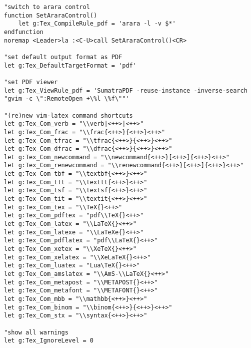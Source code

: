 \documentclass{article}
\newcommand{\syntax}[1]{\PVerb{#1}}
\begin{document}
{\begin{verbatim}
"switch to arara control
function SetAraraControl()
	let g:Tex_CompileRule_pdf = 'arara -l -v $*'
endfunction
noremap <Leader>la :<C-U>call SetAraraControl()<CR>

"set default output format as PDF
let g:Tex_DefaultTargetFormat = 'pdf'

"set PDF viewer
let g:Tex_ViewRule_pdf = 'SumatraPDF -reuse-instance -inverse-search "gvim -c \":RemoteOpen +\%l \%f\""'

"(re)new vim-latex command shortcuts
let g:Tex_Com_verb = "\\verb|<++>|<++>"
let g:Tex_Com_frac = "\\frac{<++>}{<++>}<++>"
let g:Tex_Com_tfrac = "\\tfrac{<++>}{<++>}<++>"
let g:Tex_Com_dfrac = "\\dfrac{<++>}{<++>}<++>"
let g:Tex_Com_newcommand = "\\newcommand{<++>}[<++>]{<++>}<++>"
let g:Tex_Com_renewcommand = "\\renewcommand{<++>}[<++>]{<++>}<++>"
let g:Tex_Com_tbf = "\\textbf{<++>}<++>"
let g:Tex_Com_ttt = "\\texttt{<++>}<++>"
let g:Tex_Com_tsf = "\\textsf{<++>}<++>"
let g:Tex_Com_tit = "\\textit{<++>}<++>"
let g:Tex_Com_tex = "\\TeX{}<++>"
let g:Tex_Com_pdftex = "pdf\\TeX{}<++>"
let g:Tex_Com_latex = "\\LaTeX{}<++>"
let g:Tex_Com_latexe = "\\LaTeXe{}<++>"
let g:Tex_Com_pdflatex = "pdf\\LaTeX{}<++>"
let g:Tex_Com_xetex = "\\XeTeX{}<++>"
let g:Tex_Com_xelatex = "\\XeLaTeX{}<++>"
let g:Tex_Com_luatex = "Lua\TeX{}<++>"
let g:Tex_Com_amslatex = "\\AmS-\\LaTeX{}<++>"
let g:Tex_Com_metapost = "\\METAPOST{}<++>"
let g:Tex_Com_metafont = "\\METAFONT{}<++>"
let g:Tex_Com_mbb = "\\mathbb{<++>}<++>"
let g:Tex_Com_binom = "\\binom{<++>}{<++>}<++>"
let g:Tex_Com_stx = "\\syntax{<++>}<++>"

"show all warnings
let g:Tex_IgnoreLevel = 0


\end{verbatim}}
\end{document}
